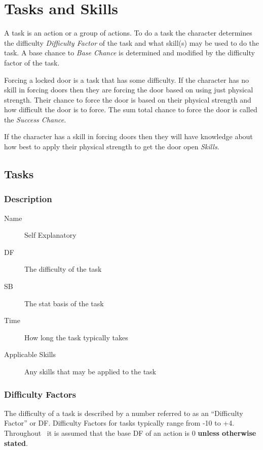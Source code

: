 \chapter{Tasks and Skills}

A task is an action or a group of actions. To do a task the 
character determines the difficulty {\em Difficulty Factor} of the 
task and what skill(s) may be used to do the task. A base chance to 
{\em Base Chance} is determined and modified by the difficulty factor 
of the task. 

Forcing a locked door is a task that has some difficulty. If the 
character has no skill in forcing doors then they are forcing the 
door based on using just physical strength. Their chance to force the 
door is based on their physical strength and how difficult the door 
is to force. The sum total chance to force the door is called the 
{\em Success Chance}.

If the character has a skill in forcing doors then they will have 
knowledge about how best to apply their physical strength to get the 
door open {\em Skills}. 

\section{Tasks}

\subsection{Description}

\begin{description}
	\item[Name] 
	Self Explanatory
	\item[DF] The difficulty of the task
	\item[SB] The stat basis of the task
	\item[Time]
    How long the task typically takes
    \item[Applicable Skills]
    Any skills that may be applied to the task
\end{description}

\subsection{Difficulty Factors}

The difficulty of a task is described by a number 
referred to as an ``Difficulty Factor'' or DF. Difficulty Factors 
for tasks typically range from -10  to +4. Throughout \SH\ it is 
assumed that the base DF of an action is 0 {\bf unless otherwise 
stated}. 

